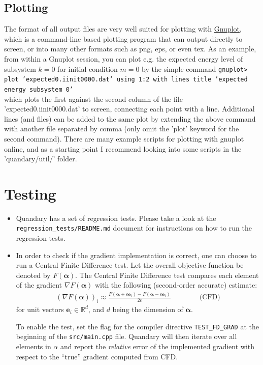 \documentclass[11pt]{article}
\newcommand{\R}{\mathds{R}}
\newcommand{\bfa}{\boldsymbol{\alpha}}
\newcommand{\bs}[1]{{\boldsymbol{#1}}}
\begin{document}
\subsection{Plotting}
The format of all output files are very well suited for plotting with \href{http://www.gnuplot.info}{Gnuplot}, which is a command-line based plotting program that can output directly to screen, or into many other formats such as png, eps, or even tex. As an example, from within a Gnuplot session, you can plot e.g. the expected energy level of subsystem $k=0$ for initial condition $m=0$ by the simple command\newline
\texttt{gnuplot> plot 'expected0.iinit0000.dat' using 1:2 with lines title 'expected energy subsystem 0'} 
\\
which plots the first against the second column of the file 'expected0.iinit0000.dat' to screen, connecting each point with a line. Additional lines (and files) can be added to the same plot by extending the above command with another file separated by comma (only omit the 'plot' keyword for the second command). There are many example scripts for plotting with gnuplot online, and as a starting point I recommend looking into some scripts in the 'quandary/util/' folder.

\section{Testing}
  \begin{itemize}
    \item Quandary has a set of regression tests. Please take a look at the \verb+regression_tests/README.md+ document for instructions on how to run the regression tests.
    \item In order to check if the gradient implementation is correct, one can choose to run a Central Finite Difference test. Let the overall objective function be denoted by $F(\boldsymbol{\alpha})$. The Central Finite Difference test compares each element of the gradient $\nabla F(\boldsymbol{\alpha})$ with the following (second-order accurate) estimate:
    \begin{align*}
       \left(\nabla F(\boldsymbol{\alpha}) \right)_i \approx \frac{F(\bfa + \epsilon\bs{e}_i) - F(\bfa - \epsilon\bs{e}_i)}{2\epsilon} \qquad \qquad \text{(CFD)}
    \end{align*}
    for unit vectors $\bs{e}_i\in \R^d$, and $d$ being the dimension of $\bfa$. 

    To enable the test, set the flag for the compiler directive \texttt{TEST\_FD\_GRAD} at the beginning of the \texttt{src/main.cpp} file. Quandary will then iterate over all elements in $\alpha$ and report the \textit{relative} error of the implemented gradient with respect to the ``true'' gradient computed from CFD. 

  \end{itemize}
\end{document}
